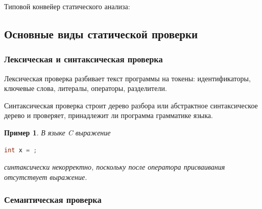 \documentclass[12pt,a4paper]{article}
\newtheorem{example}{Пример}
\begin{document}
Типовой конвейер статического анализа:

\begin{center}
\end{center}

\subsection{Основные виды статической проверки}

\subsubsection{Лексическая и синтаксическая проверка}

Лексическая проверка разбивает текст программы на токены: идентификаторы, ключевые слова, литералы, операторы, разделители.

Синтаксическая проверка строит дерево разбора или абстрактное синтаксическое дерево и проверяет, принадлежит ли программа грамматике языка.

\begin{example}
В языке C выражение
\begin{lstlisting}[language=C]
int x = ;
\end{lstlisting}
синтаксически некорректно, поскольку после оператора присваивания отсутствует выражение.
\end{example}

\subsubsection{Семантическая проверка}
\end{document}
